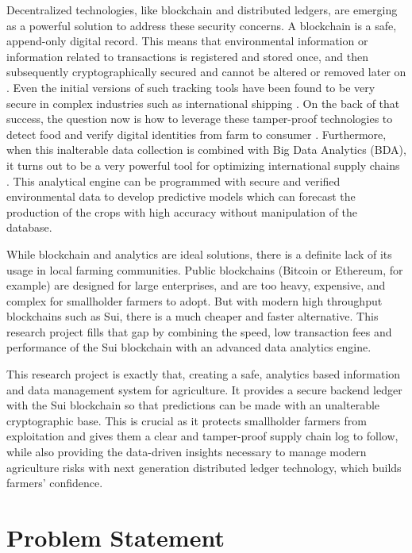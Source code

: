 Decentralized technologies, like blockchain and distributed ledgers, are emerging as a powerful solution to address these security concerns. A blockchain is a safe, append-only digital record. This means that environmental information or information related to transactions is registered and stored once, and then subsequently cryptographically secured and cannot be altered or removed later on \parencite{aliyu2023blockchain}. Even the initial versions of such tracking tools have been found to be very secure in complex industries such as international shipping \parencite{liu2021blockchain}. On the back of that success, the question now is how to leverage these tamper-proof technologies to detect food and verify digital identities from farm to consumer \parencite{cocco2021blockchain}. Furthermore, when this inalterable data collection is combined with Big Data Analytics (BDA), it turns out to be a very powerful tool for optimizing international supply chains \parencite{chauhan2025blockchain}. This analytical engine can be programmed with secure and verified environmental data to develop predictive models which can forecast the production of the crops with high accuracy without manipulation of the database.

While blockchain and analytics are ideal solutions, there is a definite lack of its usage in local farming communities. Public blockchains (Bitcoin or Ethereum, for example) are designed for large enterprises, and are too heavy, expensive, and complex for smallholder farmers to adopt. But with modern high throughput blockchains such as Sui, there is a much cheaper and faster alternative. This research project fills that gap by combining the speed, low transaction fees and performance of the Sui blockchain with an advanced data analytics engine.

This research project is exactly that, creating a safe, analytics based information and data management system for agriculture. It provides a secure backend ledger with the Sui blockchain so that predictions can be made with an unalterable cryptographic base. This is crucial as it protects smallholder farmers from exploitation and gives them a clear and tamper-proof supply chain log to follow, while also providing the data-driven insights necessary to manage modern agriculture risks with next generation distributed ledger technology, which builds farmers' confidence.

\section{Problem Statement}


